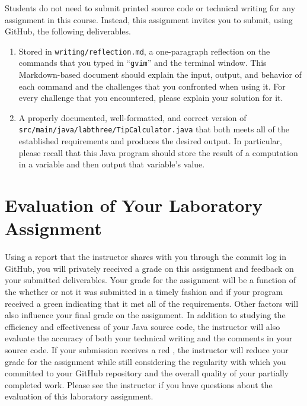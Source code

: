 \documentclass[11pt]{article}
\newcommand{\mainprogramsource}{\lstinline{src/main/java/labthree/TipCalculator.java}}
\newcommand{\reflection}{\lstinline{writing/reflection.md}}
\newcommand{\command}[1]{``\lstinline{#1}''}
\newcommand{\checkmark}{\ding{51}}
\newcommand{\naughtmark}{\ding{55}}
\begin{document}
\noindent Students do not need to submit printed source code or technical writing for any assignment in this course.
Instead, this assignment invites you to submit, using GitHub, the following deliverables.

\begin{enumerate}

  \setlength{\itemsep}{0in}

\item Stored in \reflection{}, a one-paragraph reflection on the commands that you typed in \command{gvim} and the
  terminal window. This Markdown-based document should explain the input, output, and behavior of each command and the
  challenges that you confronted when using it. For every challenge that you encountered, please explain your solution
  for it.

\item A properly documented, well-formatted, and correct version of \mainprogramsource{} that both meets all of the
  established requirements and produces the desired output. In particular, please recall that this Java program should
  store the result of a computation in a variable and then output that variable's value.

\end{enumerate}

\section*{Evaluation of Your Laboratory Assignment}

Using a report that the instructor shares with you through the commit log in GitHub, you will privately received a grade
on this assignment and feedback on your submitted deliverables. Your grade for the assignment will be a function of the
whether or not it was submitted in a timely fashion and if your program received a green \checkmark{} indicating that it
met all of the requirements. Other factors will also influence your final grade on the assignment. In addition to
studying the efficiency and effectiveness of your Java source code, the instructor will also evaluate the accuracy of
both your technical writing and the comments in your source code. If your submission receives a red \naughtmark{}, the
instructor will reduce your grade for the assignment while still considering the regularity with which you committed to
your GitHub repository and the overall quality of your partially completed work. Please see the instructor if you have
questions about the evaluation of this laboratory assignment.
\end{document}
